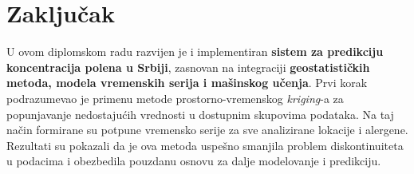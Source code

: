\documentclass[12pt]{article}
\begin{document}
\begin{table}[h!]
\centering
\caption{RLMSLE vrednosti za predikciju koncentracije jove u Požarevcu po modelima i konfiguracijama meteoroloških podataka.}
\label{tab:rlmsle_jova}
\end{table}

\newpage
\section{Zaključak}
U ovom diplomskom radu razvijen je i implementiran \textbf{sistem za predikciju koncentracija polena u Srbiji}, zasnovan na integraciji \textbf{geostatističkih metoda, modela vremenskih serija i mašinskog učenja}. Prvi korak podrazumevao je primenu metode prostorno-vremenskog \textit{kriging}-a za popunjavanje nedostajućih vrednosti u dostupnim skupovima podataka. Na taj način formirane su potpune vremensko serije za sve analizirane lokacije i alergene. Rezultati su pokazali da je ova metoda uspešno smanjila problem diskontinuiteta u podacima i obezbedila pouzdanu osnovu za dalje modelovanje i predikciju.
\end{document}
